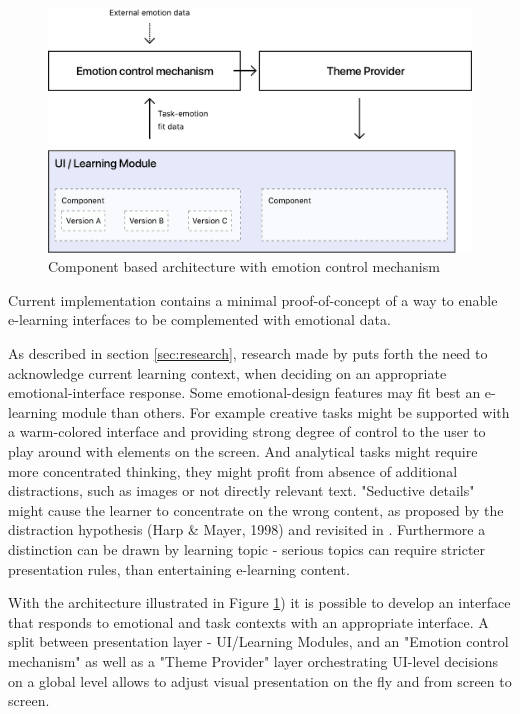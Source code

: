 \begin{figure}
	\centering
	\includegraphics[width=1\linewidth]{graphics/App-Architecture}
	\caption{Component based architecture with emotion control mechanism}
	\label{fig:app-architecture}
\end{figure}

Current implementation contains a minimal proof-of-concept of a way to enable e-learning interfaces to be complemented with emotional data. 

As described in section \ref{sec:research}, research made by \cite{Haaranen2015} puts forth the need to acknowledge current learning context, when deciding on an appropriate emotional-interface response. 
Some emotional-design features may fit best an e-learning module than others.
For example creative tasks might be supported with a warm-colored interface and providing strong degree of control to the user to play around with elements on the screen. 
And analytical tasks might require more concentrated thinking, they might profit from absence of additional distractions, such as images or not directly relevant text. "Seductive details" might cause the learner to concentrate on the wrong content, as proposed by the distraction hypothesis (Harp \& Mayer, 1998) and revisited in \cite{Chang2014}.
Furthermore a distinction can be drawn by learning topic - serious topics can require stricter presentation rules, than entertaining e-learning content.

With the architecture illustrated in Figure \ref{fig:app-architecture}) it is possible to develop an interface that responds to emotional and task contexts with an appropriate interface. A split between presentation layer - UI/Learning Modules, and an "Emotion control mechanism" as well as a "Theme Provider" layer orchestrating UI-level decisions on a global level allows to adjust visual presentation on the fly and from screen to screen.


